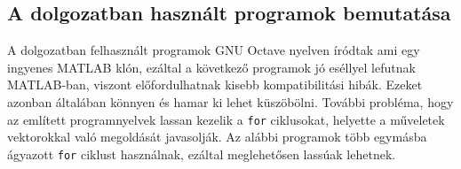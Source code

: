 \documentclass[a4paper,12pt]{report}
\begin{document}
\begin{appendices}

    
    
    
    
    
    
    
    
    
    
    
	\chapter{A dolgozatban használt programok bemutatása} \label{Appendix}
		A dolgozatban felhasznált programok GNU Octave nyelven íródtak ami egy ingyenes MATLAB klón, ezáltal a következő programok jó eséllyel lefutnak MATLAB-ban, viszont előfordulhatnak kisebb kompatibilitási hibák. Ezeket azonban általában könnyen és hamar ki lehet küszöbölni. További probléma, hogy az említett programnyelvek lassan kezelik a \texttt{for} ciklusokat, helyette a műveletek vektorokkal való megoldását javasolják. Az alábbi programok több egymásba ágyazott \texttt{for} ciklust használnak, ezáltal meglehetősen lassúak lehetnek.
		
        















    
        
        
        
        
        
        
        
        
        
        
        
        
        

\end{appendices}
\end{document}
